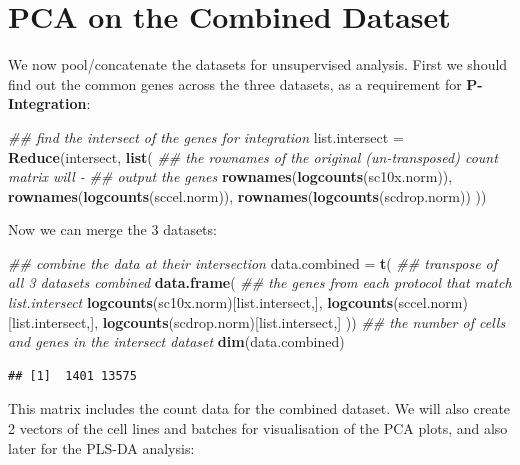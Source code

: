 \documentclass[]{book}
\newenvironment{Shaded}{\begin{snugshade}}{\end{snugshade}}
\newcommand{\CommentTok}[1]{\textcolor[rgb]{0.56,0.35,0.01}{\textit{#1}}}
\newcommand{\KeywordTok}[1]{\textcolor[rgb]{0.13,0.29,0.53}{\textbf{#1}}}
\newcommand{\NormalTok}[1]{#1}
\newcommand{\StringTok}[1]{\textcolor[rgb]{0.31,0.60,0.02}{#1}}
\theoremstyle{definition}
\theoremstyle{definition}
\theoremstyle{definition}
\theoremstyle{remark}
\begin{document}
\hypertarget{pca-on-the-combined-dataset}{%
\section{PCA on the Combined
Dataset}\label{pca-on-the-combined-dataset}}

We now pool/concatenate the datasets for unsupervised analysis. First we
should find out the common genes across the three datasets, as a
requirement for \textbf{P-Integration}:

\begin{Shaded}
\begin{Highlighting}[]
\CommentTok{## find the intersect of the genes for integration}
\NormalTok{list.intersect =}\StringTok{ }\KeywordTok{Reduce}\NormalTok{(intersect, }\KeywordTok{list}\NormalTok{(}
\CommentTok{## the rownames of the original (un-transposed) count matrix will -}
\CommentTok{## output the genes}
  \KeywordTok{rownames}\NormalTok{(}\KeywordTok{logcounts}\NormalTok{(sc10x.norm)),}
  \KeywordTok{rownames}\NormalTok{(}\KeywordTok{logcounts}\NormalTok{(sccel.norm)),}
  \KeywordTok{rownames}\NormalTok{(}\KeywordTok{logcounts}\NormalTok{(scdrop.norm))}
\NormalTok{))}
\end{Highlighting}
\end{Shaded}

Now we can merge the 3 datasets:

\begin{Shaded}
\begin{Highlighting}[]
\CommentTok{## combine the data at their intersection}
\NormalTok{data.combined =}\StringTok{ }\KeywordTok{t}\NormalTok{( }\CommentTok{## transpose of all 3 datasets combined}
  \KeywordTok{data.frame}\NormalTok{(}
    \CommentTok{## the genes from each protocol that match list.intersect}
    \KeywordTok{logcounts}\NormalTok{(sc10x.norm)[list.intersect,],}
    \KeywordTok{logcounts}\NormalTok{(sccel.norm)[list.intersect,],}
    \KeywordTok{logcounts}\NormalTok{(scdrop.norm)[list.intersect,] ))}
\CommentTok{## the number of cells and genes in the intersect dataset}
\KeywordTok{dim}\NormalTok{(data.combined)}
\end{Highlighting}
\end{Shaded}

\begin{verbatim}
## [1]  1401 13575
\end{verbatim}

This matrix includes the count data for the combined dataset. We will
also create 2 vectors of the cell lines and batches for visualisation of
the PCA plots, and also later for the PLS-DA analysis:
\end{document}
